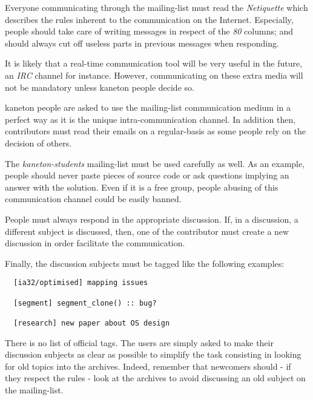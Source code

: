 Everyone communicating through the mailing-list must read the
\textit{Netiquette} which describes the rules inherent to the communication
on the Internet. Especially, people should take care of writing messages in
respect of the \textit{80} columns; and should always cut off useless parts
in previous messages when responding.

It is likely that a real-time communication tool will be very useful in the
future, an \textit{IRC} channel for instance. However, communicating on
these extra media will not be mandatory unless kaneton people decide so.

kaneton people are asked to use the mailing-list communication medium
in a perfect way as it is the unique intra-communication channel. In
addition then, contributors must read their emails on a regular-basis
as some people rely on the decision of others.

The \textit{kaneton-students} mailing-list must be used carefully as well. As
an example, people should never paste pieces of source code or ask
questions implying an answer with the solution. Even if it is a free
group, people abusing of this communication channel could be easily banned.

People must always respond in the appropriate discussion. If, in a discussion,
a different subject is discussed, then, one of the contributor must create
a new discussion in order facilitate the communication.

Finally, the discussion subjects must be tagged like the following examples:

\begin{verbatim}
  [ia32/optimised] mapping issues

  [segment] segment_clone() :: bug?

  [research] new paper about OS design
\end{verbatim}

There is no list of official tags. The users are simply asked to make
their discussion subjects as clear as possible to simplify the task
consisting in looking for old topics into the archives. Indeed, remember
that newcomers should - if they respect the rules - look at the archives
to avoid discussing an old subject on the mailing-list.
